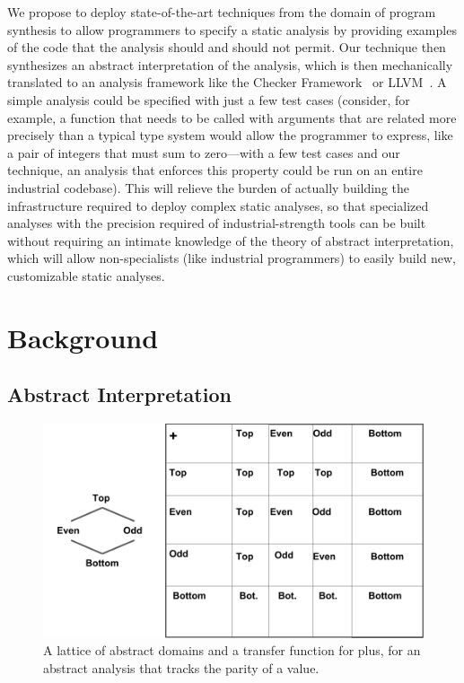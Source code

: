 \documentclass[10pt,conference]{IEEEtran}
\begin{document}
We propose to deploy state-of-the-art techniques from the domain of program
synthesis to allow programmers to specify a static analysis by providing
examples of the code that the analysis should and should not permit.
Our technique then synthesizes an abstract interpretation of the analysis,
which is then mechanically translated to an analysis framework like
the Checker Framework~\cite{checker-framework} or LLVM~\cite{lattner04:_llvm}.
A simple analysis could be specified
with just a few test cases (consider, for example, a function that needs to
be called with arguments that are related more precisely than a typical
type system would allow the programmer to express, like a pair of integers that
must sum to zero---with a few test cases and our technique, an analysis that
enforces this property could be run on an entire industrial codebase).
This will relieve the burden of actually building the infrastructure
required to deploy complex static analyses, so that specialized analyses
with the precision required of industrial-strength tools can be built without
requiring an intimate knowledge of the theory of abstract interpretation,
which will allow non-specialists (like industrial programmers) to easily
build new, customizable static analyses.

\section{Background}

\subsection{Abstract Interpretation}

\begin{figure}
 \includegraphics[width=\linewidth]{parity.png}
 \caption{A lattice of abstract domains and a transfer function
   for plus, for an abstract analysis that tracks the parity of
 a value.}
\label{fig-parity}
\end{figure} 
\end{document}
